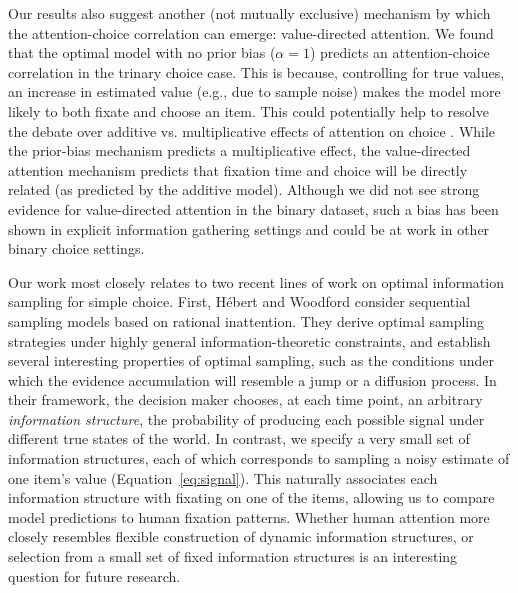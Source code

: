 Our results also suggest another (not mutually exclusive) mechanism by which the attention-choice correlation can emerge: value-directed attention. We found that the optimal model with no prior bias ($\alpha=1$) predicts an attention-choice correlation in the trinary choice case. This is because, controlling for true values, an increase in estimated value (e.g., due to sample noise) makes the model more likely to both fixate and choose an item. This could potentially help to resolve the debate over additive vs. multiplicative effects of attention on choice \citep{cavanagh2014eye,smith2019gaze}. While the prior-bias mechanism predicts a multiplicative effect, the value-directed attention mechanism predicts that fixation time and choice will be directly related (as predicted by the additive model). Although we did not see strong evidence for value-directed attention in the binary dataset, such a bias has been shown in explicit information gathering settings \citep{hunt2016approachinduced} and could be at work in other binary choice settings.

Our work most closely relates to two recent lines of work on optimal information sampling for simple choice. First, H\'ebert and Woodford \citep{hebert2017rational,hebert2019rational} consider sequential sampling models based on rational inattention. They derive optimal sampling strategies under highly general information-theoretic constraints, and establish several interesting properties of optimal sampling, such as the conditions under which the evidence accumulation will resemble a jump or a diffusion process. In their framework, the decision maker chooses, at each time point, an arbitrary \emph{information structure}, the probability of producing each possible signal under different true states of the world. In contrast, we specify a very small set of information structures, each of which corresponds to sampling a noisy estimate of one item's value (Equation~\ref{eq:signal}). This naturally associates each information structure with fixating on one of the items, allowing us to compare model predictions to human fixation patterns. Whether human attention more closely resembles flexible construction of dynamic information structures, or selection from a small set of fixed information structures is an interesting question for future research.


